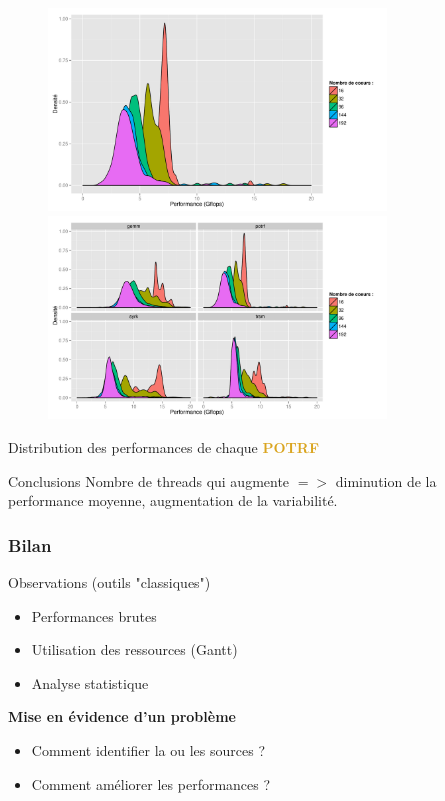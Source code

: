 \documentclass[xcolor={usenames,dvipsnames,svgnames,table}, aspectratio=43]{beamer}
\newcommand{\potrfcolor}[1]{\textcolor{Goldenrod}{\textbf{#1}}\xspace}
\newcommand{\potrf}{\potrfcolor{POTRF}}
\begin{document}
\begin{frame}
\begin{figure}
{    }%
     {%
      \includegraphics[width=0.8\textwidth]{graph/anim-distrib/graph_anim_distrib_4.pdf}%
    }%
     {%
      \includegraphics[width=0.8\textwidth]{graph/graph_distrib_overview.pdf}%
    }%

  \end{figure}
   {
    Distribution des performances de chaque \potrf
  }
   {
    \begin{block}{Conclusions}
      Nombre de threads qui augmente $=>$ diminution de la performance moyenne, augmentation de la variabilité.
    \end{block}
  }
\end{frame}


\begin{frame}
  \frametitle{Bilan}

  \begin{block}{Observations (outils "classiques")}
    \begin{itemize}
      \item Performances brutes
      \item Utilisation des ressources (Gantt)
      \item Analyse statistique
    \end{itemize}
    \textbf{Mise en évidence d'un problème}
  \end{block}

  \begin{itemize}
    \item Comment identifier la ou les sources ?
    \item Comment améliorer les performances ?
  \end{itemize}
\end{frame}
\end{document}
